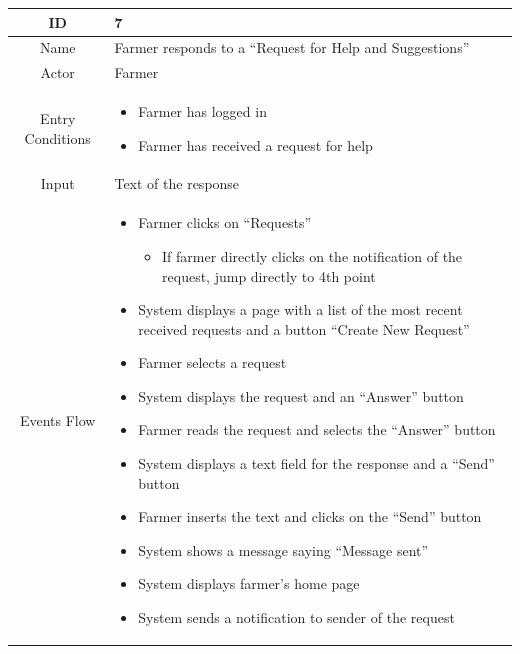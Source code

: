 \documentclass{article}
\begin{document}
\begin{center}
    \begin{longtable}{|c| p{10cm}|}
        \hline
            ID & 7 \\
        \hline
            Name & Farmer responds to a “Request for Help and Suggestions”  \\
        \hline
            Actor & Farmer \\
        \hline
            Entry Conditions & 
                                \begin{itemize}
                                    \item Farmer has logged in
                                    \item Farmer has received a request for help
                                \end{itemize}\\
        \hline
            Input & Text of the response \\
        \hline
            Events Flow &   \begin{itemize}
                                \item Farmer clicks on “Requests”
                                        \begin{itemize}
                                            \item If farmer directly clicks on the notification of the request, jump directly to 4th point
                                        \end{itemize}
                                \item System displays a page with a list of the most recent received requests and a button “Create New Request”
                                \item Farmer selects a request
                                \item System displays the request and an “Answer” button
                                \item Farmer reads the request and selects the “Answer” button
                                \item System displays a text field for the response and a “Send” button
                                \item Farmer inserts the text and clicks on the “Send” button
                                \item System shows a message saying “Message sent” 
                                \item System displays farmer’s home page
                                \item System sends a notification to sender of the request

\end{itemize}
\end{longtable}
\end{center}
\end{document}
